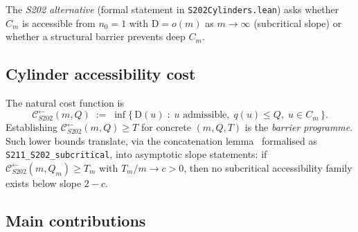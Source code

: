 \documentclass[11pt,a4paper]{article}
\theoremstyle{plain}
\theoremstyle{definition}
\newcommand{\defect}{\mathrm{D}}
\newcommand{\Cback}{\mathcal{C}^{\!\leftarrow}_{S202}}
\begin{document}
The \emph{S202 alternative} (formal statement in
\texttt{S202Cylinders.lean}) asks whether $C_m$ is accessible from
$n_0 = 1$ with $\defect = o(m)$ as $m \to \infty$ (subcritical
slope) or whether a structural barrier prevents deep $C_m$.

\subsection{Cylinder accessibility cost}

The natural cost function is
\[
  \Cback(m, Q) \;:=\;
   \inf \bigl\{ \,\defect(u) \;:\;
                u \text{ admissible},\;
                q(u) \le Q,\;
                u \in C_m \,\bigr\}.
\]
Establishing $\Cback(m, Q) \ge T$ for concrete $(m, Q, T)$ is the
\emph{barrier programme}. Such lower bounds translate, via the
concatenation lemma~\cite[\S{}S211]{andujar2026program} formalised as
\texttt{S211\_S202\_subcritical}, into asymptotic slope statements: if
$\Cback(m, Q_m) \ge T_m$ with $T_m / m \to c > 0$, then no
subcritical accessibility family exists below slope $2 - c$.

\subsection{Main contributions}
\end{document}
